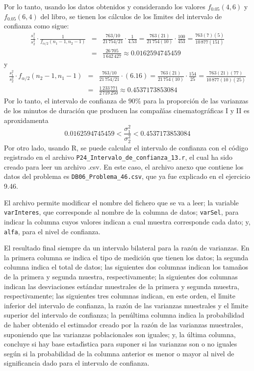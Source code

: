 \begin{solucion}
\begin{equation*}
 \end{equation*}
 Por lo tanto, usando los datos obtenidos y considerando los valores $f_{0.05}(4,6)$ y $f_{0.05}(6,4)$ del libro, se tienen los c\'alculos de los l\'{\i}mites del intervalo de confianza como sigue:
 \begin{eqnarray*}
  \frac{s_1^2}{s_2^2}\cdot \frac{1}{f_{\alpha/2}(n_1-1,n_2-1)} & = & \frac{763/10}{21\,754/21}\cdot \frac{1}{4.53} = \frac{763(21)}{21\,754(10)} \cdot \frac{100}{453} = \frac{763(7)(5)}{10\,877(151)} \\
  & = & \frac{26\,705}{1\,642\,427} \approx 0.0162594745459
 \end{eqnarray*}
 y
 \begin{eqnarray*}
  \frac{s_1^2}{s_2^2}\cdot f_{\alpha/2}(n_2-1,n_1-1) & = & \frac{763/10}{21\,754/21} \cdot (6.16) = \frac{763(21)}{21\,754(10)} \cdot \frac{154}{25} = \frac{763(21)(77)}{10\,877(10)(25)} \\
  & = & \frac{1\,233\,771}{2\,719\,250} \approx 0.4537173853084
 \end{eqnarray*}
 Por lo tanto, el intervalo de confianza de $90\%$ para la proporci\'on de las varianzas de los minutos de duraci\'on que producen las compa\~n\'{\i}as cinematogr\'aficas I y II es aproxidamenta
 \begin{equation*}
  0.0162594745459 < \frac{\sigma_1^2}{\sigma_2^2} < 0.4537173853084
 \end{equation*}
 Por otro lado, usando R, se puede calcular el intervalo de confianza con el c\'odigo registrado en el archivo \texttt{P24\_Intervalo\_de\_confianza\_13.r}, el cual ha sido creado para leer un archivo .csv. En este caso, el archivo anexo que contiene los datos del problema es \texttt{DB06\_Problema\_46.csv}, que ya fue explicado en el ejercicio 9.46.
 \par 
 El archivo permite modificar el nombre del fichero que se va a leer; la variable \texttt{varInteres}, que corresponde al nombre de la columna de datos; \texttt{varSel}, para indicar la columna cuyos valores indican a cual muestra corresponde cada dato; y, \texttt{alfa}, para el nivel de confianza.
 \par 
 El resultado final siempre da un intervalo bilateral para la raz\'on de varianzas. En la primera columna se indica el tipo de medici\'on que tienen los datos; la segunda columna indica el total de datos; las siguientes dos columnas indican los tama\~nos de la primera y segunda muestra, respectivamente; la siguientes dos columnas indican las desviaciones est\'andar muestrales de la primera y segunda muestra, respectivamente; las siguientes tres columnas indican, en este orden, el l\'{\i}mite inferior del intervalo de confianza, la raz\'on de las varianzas muestrales y el l\'{\i}mite superior del intervalo de confianza; la pen\'ultima columna indica la probabilidad de haber obtenido el estimador creado por la raz\'on de las varianzas muestrales, suponiendo que las varianzas poblacionales son iguales; y, la \'ultima columna, concluye si hay base estad\'{\i}stica para suponer si las varianzas son o no iguales seg\'un si la probabilidad de la columna anterior es menor o mayor al nivel de significancia dado para el intervalo de confianza.

\end{solucion}
